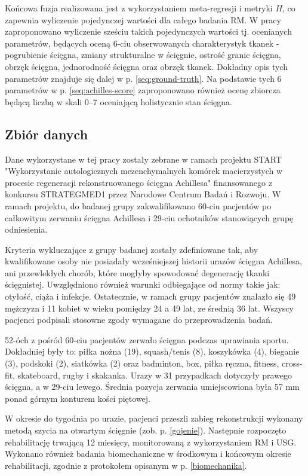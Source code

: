 Końcowa fuzja realizowana jest z wykorzystaniem meta-regresji i metryki $H$, co zapewnia wyliczenie pojedynczej wartości dla całego badania RM. W pracy zaproponowano wyliczenie sześciu takich pojedynczych wartości tj. ocenianych parametrów, będących oceną 6-ciu obserwowanych charakterystyk tkanek - pogrubienie ścięgna, zmiany strukturalne w ścięgnie, ostrość granic ścięgna, obrzęk ścięgna, jednorodność ścięgna oraz obrzęk tkanek. Dokładny opis tych parametrów znajduje się dalej w p. \ref{seq:ground-truth}. Na podstawie tych 6 parametrów w p. \ref{seq:achilles-score} zaproponowano również ocenę zbiorcza będącą liczbą w skali 0--7 oceniającą holistycznie stan ścięgna.

\subsection{Zbiór danych}
\label{seq:zbior-danych}
Dane wykorzystane w tej pracy zostały zebrane w ramach projektu START "Wykorzystanie autologicznych mezenchymalnych komórek macierzystych w procesie regeneracji rekonstruowanego ścięgna Achillesa" finansowanego z konkursu STRATEGMED1 przez Narodowe Centrum Badań i Rozwoju. W ramach projektu, \linebreak do badanej grupy zakwalifikowano 60-ciu pacjentów po całkowitym zerwaniu ścięgna Achillesa i 29-ciu ochotników stanowiących grupę odniesienia. 

Kryteria wykluczające z grupy badanej zostały zdefiniowane tak, aby kwalifikowane osoby nie posiadały wcześniejszej historii urazów ścięgna Achillesa, ani przewlekłych chorób, które mogłyby spowodować degenerację tkanki ścięgnistej. Uwzględniono również warunki odbiegające od normy takie jak: otyłość, ciąża i infekcje. Ostatecznie, w ramach grupy pacjentów znalazło się 49 mężczyzn i 11 kobiet w wieku pomiędzy 24 a 49 lat, ze średnią 36 lat. Wszyscy pacjenci podpisali stosowne zgody wymagane do przeprowadzenia badań.   

52-óch z pośród 60-ciu pacjentów zerwało ścięgna podczas uprawiania sportu. Dokładniej były to: piłka nożna (19), squash/tenis (8), koszykówka (4), bieganie (3), podskoki (2), siatkówka (2) oraz badminton, box, piłka ręczna, fitness, cross-fit, skateboard, rugby i skakanka. Urazy w 31 przypadkach dotyczyły prawego ścięgna, \linebreak a w 29-ciu lewego. Średnia pozycja zerwania umiejscowiona była 57 mm ponad górnym konturem kości piętowej.

W okresie do tygodnia po urazie, pacjenci przeszli zabieg rekonstrukcji wykonany metodą szycia na otwartym ścięgnie (zob. p. \ref{gojenie}). Następnie rozpoczęto rehabilitację trwającą 12 miesięcy, monitorowaną z wykorzystaniem RM i USG. Wykonano również badania biomechaniczne w środkowym i końcowym okresie rehabilitacji, zgodnie z protokołem opisanym w p. \ref{biomechanika}.

